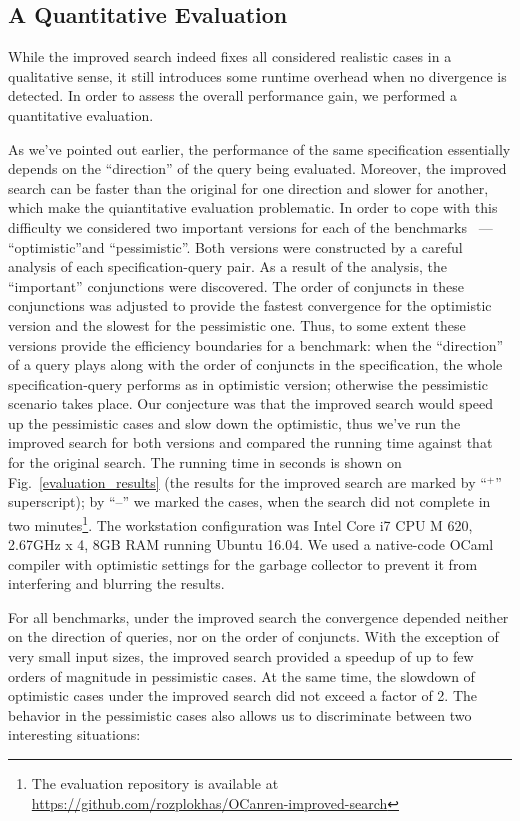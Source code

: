 \subsection{A Quantitative Evaluation}



While the improved search indeed fixes all considered realistic cases in a qualitative sense, it still introduces some runtime
overhead when no divergence is detected. In order to assess the overall performance gain, we performed a quantitative
evaluation.

As we've pointed out earlier, the performance of the same specification essentially depends on the ``direction'' of
the query being evaluated. Moreover, the improved search can be faster than the original for one direction and
slower for another, which make the quiantitative evaluation problematic. In order to cope with this difficulty we
considered two important versions for each of the benchmarks ~--- ``optimistic''and ``pessimistic''.
Both versions were constructed by a careful analysis of each specification-query pair. As a result of the
analysis, the ``important'' conjunctions were discovered. The order of conjuncts in these conjunctions was adjusted to provide
the fastest convergence for the optimistic version and the slowest for the pessimistic one. Thus, to some extent these
versions provide the efficiency boundaries for a benchmark: when the ``direction'' of a query plays along with the
order of conjuncts in the specification, the whole specification-query performs as in optimistic version; otherwise
the pessimistic scenario takes place. Our conjecture was that the improved search would speed up the pessimistic
cases and slow down the optimistic, thus we've run the improved search for both versions and compared the running time
against that for the original search. The running time in seconds is shown on Fig.~\ref{evaluation_results} (the results
for the improved search are marked by ``$^+$'' superscript); by ``--'' we marked the cases, when the search did not
complete in two minutes\footnote{The evaluation repository is available at \url{https://github.com/rozplokhas/OCanren-improved-search}}. The workstation configuration was Intel Core i7 CPU M 620, 2.67GHz x 4, 8GB RAM running Ubuntu 16.04. We used a
native-code OCaml compiler with optimistic settings for the garbage collector to prevent it from interfering and blurring the
results.

For all benchmarks, under the improved search the convergence depended neither on the direction of queries, nor on the
order of conjuncts. With the exception of very small input sizes, the improved search provided a speedup of up to
few orders of magnitude in pessimistic cases. At the same time, the slowdown of optimistic cases under
the improved search did not exceed a factor of 2. The behavior in the pessimistic cases also allows us to discriminate
between two interesting situations:

